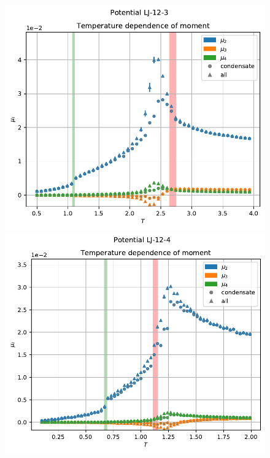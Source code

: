 \documentclass[pdf,hyperref={unicode}]{beamer}
\begin{document}
\begin{frame}
\transdissolve[duration=0.2]

\begin{figure}[h]
\begin{center}
\begin{minipage}[h]{0.35\linewidth}
\includegraphics[width=\textwidth, keepaspectratio]{plot_moment_Potential LJ-12-3_1}
\end{minipage}
\begin{minipage}[h]{0.35\linewidth}
\includegraphics[width=\textwidth, keepaspectratio]{plot_moment_Potential LJ-12-4_1}
\end{minipage}



\end{center}
\end{figure}
\end{frame}
\end{document}
